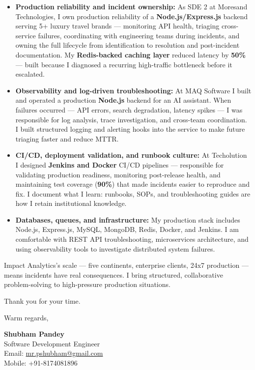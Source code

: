 \documentclass[a4paper,10pt]{article}
\begin{document}
\begin{itemize}[leftmargin=12pt, itemsep=3pt, parsep=0pt]
  \item \textbf{Production reliability and incident ownership:} As SDE 2 at Moresand Technologies, I own production reliability of a \textbf{Node.js/Express.js} backend serving 5+ luxury travel brands — monitoring API health, triaging cross-service failures, coordinating with engineering teams during incidents, and owning the full lifecycle from identification to resolution and post-incident documentation. My \textbf{Redis-backed caching layer} reduced latency by \textbf{50\%} — built because I diagnosed a recurring high-traffic bottleneck before it escalated.

  \item \textbf{Observability and log-driven troubleshooting:} At MAQ Software I built and operated a production \textbf{Node.js} backend for an AI assistant. When failures occurred — API errors, search degradation, latency spikes — I was responsible for log analysis, trace investigation, and cross-team coordination. I built structured logging and alerting hooks into the service to make future triaging faster and reduce MTTR.

  \item \textbf{CI/CD, deployment validation, and runbook culture:} At Techolution I designed \textbf{Jenkins and Docker} CI/CD pipelines — responsible for validating production readiness, monitoring post-release health, and maintaining test coverage (\textbf{90\%}) that made incidents easier to reproduce and fix. I document what I learn: runbooks, SOPs, and troubleshooting guides are how I retain institutional knowledge.

  \item \textbf{Databases, queues, and infrastructure:} My production stack includes Node.js, Express.js, MySQL, MongoDB, Redis, Docker, and Jenkins. I am comfortable with REST API troubleshooting, microservices architecture, and using observability tools to investigate distributed system failures.
\end{itemize}

\vspace{6pt}
Impact Analytics's scale — five continents, enterprise clients, 24x7 production — means incidents have real consequences. I bring structured, collaborative problem-solving to high-pressure production situations.

\vspace{12pt}
Thank you for your time.

\vspace{8pt}
Warm regards,

\vspace{6pt}
\textbf{Shubham Pandey} \\
Software Development Engineer \\
Email: \href{mailto:mr.pshubham@gmail.com}{mr.pshubham@gmail.com} \\
Mobile: +91-8174081896
\end{document}
